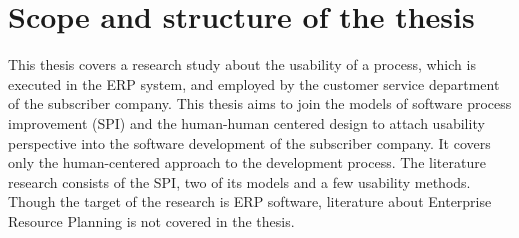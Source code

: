\documentclass[12pt,a4paper,oneside,pdftex]{report}
\begin{document}
%    
%    
\section{Scope and structure of the thesis}
\label{sec:scope}

This thesis covers a research study about the usability of a process, which is executed in the ERP system, and employed by the customer service department of the subscriber company. This thesis aims to join the models of software process improvement (SPI) and the human-human centered design to attach usability perspective into the software development of the subscriber company. It covers only the human-centered approach to the development process. The literature  research consists of the SPI, two of its models and a few usability methods. Though the target of the research is ERP software, literature about Enterprise Resource Planning is not covered in the thesis.
\end{document}
